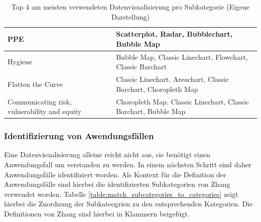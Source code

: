 \begin{table}[h]
{\begin{tabular}{@{}ll@{}}
PPE & Scatterplot, Radar, Bubblechart, Bubble Map \\ \midrule
Hygiene & Bubble Map, Classic Linechart, Flowchart, Classic Barchart \\ \midrule
Flatten the Curve & Classic Linechart, Areachart, Classic Barchart, Choropleth Map \\ \midrule
Communicating risk, vulnerability and equity & Choropleth Map, Classic Linechart, Classic Barchart, Bubble Map \\ \bottomrule
\end{tabular}%
}
\caption{Top 4 am meisten verwendeten Datenvisualisierung pro Subkategorie (Eigene Darstellung)}
\label{table:jupyter_notebook_most_used_data_visualizations_per_subcategory}
\end{table}

\clearpage
\subsubsection{Identifizierung von Awendungsfällen} \label{ch:identification_of_use_cases}
Eine Datenvisualisierung alleine reicht nicht aus, sie benötigt einen Anwendungsfall um verstanden zu werden. In einem nächsten Schritt sind daher Anwendungsfälle identifiziert worden. Als Kontext für die Definition der Anwendungsfälle sind hierbei die identifizierten Subkategorien von Zhang verwendet worden. Tabelle \ref{table:match_subcategories_to_categories} zeigt hierbei die Zuordnung der Subkateogrien zu den entsprechenden Kategorien. Die Definitionen von Zhang sind hierbei in Klammern beigefügt.

